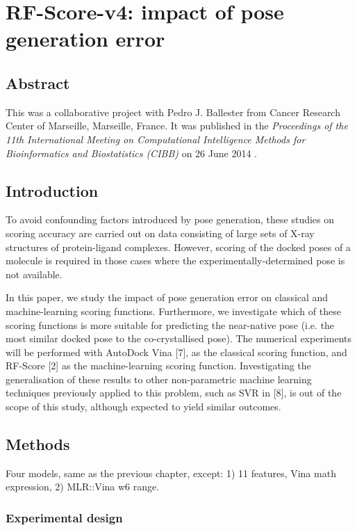 \chapter{RF-Score-v4: impact of pose generation error}

\section{Abstract}

This was a collaborative project with Pedro J. Ballester from Cancer Research Center of Marseille, Marseille, France. It was published in the \textit{Proceedings of the 11th International Meeting on Computational Intelligence Methods for Bioinformatics and Biostatistics (CIBB)} on 26 June 2014 \citep{1434}.

\section{Introduction}

To avoid confounding factors introduced by pose generation, these studies on scoring accuracy are carried out on data consisting of large sets of X-ray structures of protein-ligand complexes. However, scoring of the docked poses of a molecule is required in those cases where the experimentally-determined pose is not available.

In this paper, we study the impact of pose generation error on classical and machine-learning scoring functions. Furthermore, we investigate which of these scoring functions is more suitable for predicting the near-native pose (i.e. the most similar docked pose to the co-crystallised pose). The numerical experiments will be performed with AutoDock Vina [7], as the classical scoring function, and RF-Score [2] as the machine-learning scoring function. Investigating the generalisation of these results to other non-parametric machine learning techniques previously applied to this problem, such as SVR in [8], is out of the scope of this study, although expected to yield similar outcomes.

\section{Methods}

Four models, same as the previous chapter, except: 1) 11 features, Vina math expression, 2) MLR::Vina w6 range.

\subsection{Experimental design}


